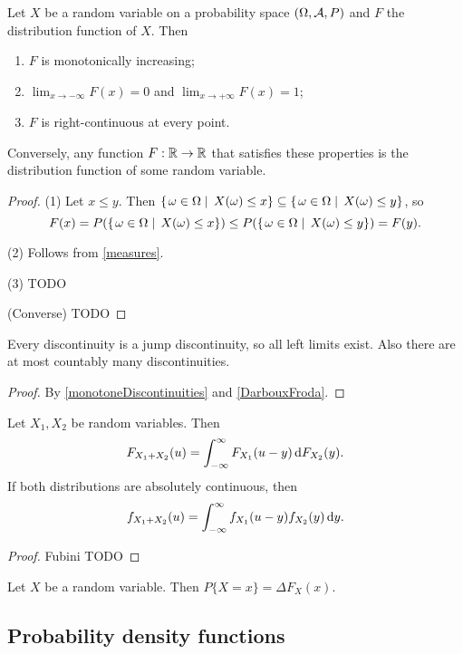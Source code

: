 \begin{proposition}
Let $X$ be a random variable on a probability space $\left( \Omega, \mathcal{A}, P \right)$ and $F$ the distribution function of $X$. Then
\begin{enumerate}
\item $F$ is monotonically increasing;
\item $\lim_{x\to-\infty} F(x) = 0$ and $\lim_{x\to+\infty} F(x) = 1$; 
\item $F$ is right-continuous at every point.
\end{enumerate}
Conversely, any function $F:\mathbb{R}\to\mathbb{R}$ that satisfies these properties is the distribution function of some random variable.
\end{proposition}
\begin{proof}
(1) Let $x\leq y$. Then $\left\{\left. \omega\in \Omega \;\right|\; X(\omega) \leq x \right\} \subseteq \left\{\left. \omega\in \Omega \;\right|\; X(\omega) \leq y \right\}$, so
\[ F(x) =  P(\left\{\left. \omega\in \Omega \;\right|\; X(\omega) \leq x \right\}) \leq  P(\left\{\left. \omega\in \Omega \;\right|\; X(\omega) \leq y \right\}) = F(y). \]

(2) Follows from \ref{measures}.

(3) TODO

(Converse) TODO
\end{proof}
\begin{corollary}
Every discontinuity is a jump discontinuity, so all left limits exist. Also there are at most countably many discontinuities.
\end{corollary}
\begin{proof}
By \ref{monotoneDiscontinuities} and \ref{DarbouxFroda}.
\end{proof}

\begin{proposition}
Let $X_1, X_2$ be random variables. Then
\[ F_{X_1+X_2}(u) = \int_{-\infty}^\infty F_{X_1}(u-y)\operatorname{d \!}{F_{X_2}(y)}. \]
If both distributions are absolutely continuous, then
\[ f_{X_1+X_2}(u) = \int_{-\infty}^\infty f_{X_1}(u-y)f_{X_2}(y)\operatorname{d \!}{y}. \]
\end{proposition}
\begin{proof}
Fubini TODO
\end{proof}

\begin{lemma}
Let $X$ be a random variable. Then $P\{X = x\} = \Delta F_X(x)$.
\end{lemma}

\subsection{Probability density functions}

